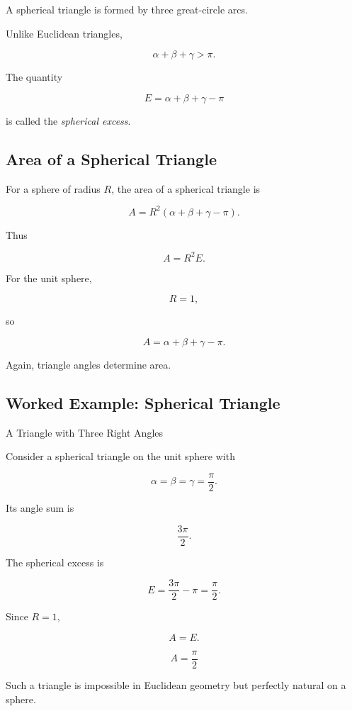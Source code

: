 A spherical triangle is formed by three great-circle arcs.

Unlike Euclidean triangles,

\[
\boxed{
\alpha+\beta+\gamma>\pi.
}
\]

The quantity

\[
\boxed{
E
=
\alpha+\beta+\gamma-\pi
}
\]

is called the \emph{spherical excess}.

\subsection{Area of a Spherical Triangle}
\label{subsec:spherical-triangle-area}

For a sphere of radius \(R\), the area of a spherical triangle is

\[
\boxed{
A
=
R^2
(\alpha+\beta+\gamma-\pi).
}
\]

Thus

\[
\boxed{
A=R^2E.
}
\]

For the unit sphere,

\[
R=1,
\]

so

\[
\boxed{
A=\alpha+\beta+\gamma-\pi.
}
\]

Again, triangle angles determine area.

\subsection{Worked Example: Spherical Triangle}
\label{subsec:worked-spherical-triangle}

\begin{workedexamplebox}{A Triangle with Three Right Angles}

Consider a spherical triangle on the unit sphere with

\[
\alpha=\beta=\gamma=\frac{\pi}{2}.
\]

Its angle sum is

\[
\frac{3\pi}{2}.
\]

The spherical excess is

\[
E
=
\frac{3\pi}{2}-\pi
=
\frac{\pi}{2}.
\]

Since \(R=1\),

\[
A=E.
\]

\begin{answerbox}
\[
\boxed{A=\frac{\pi}{2}}
\]
\end{answerbox}

Such a triangle is impossible in Euclidean geometry but perfectly natural on
a sphere.
\end{workedexamplebox}

